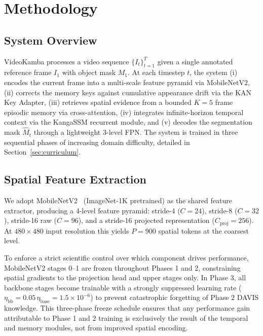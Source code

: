 \documentclass[sigconf]{acmart}
\begin{document}
\section{Methodology}
\label{sec:method}

\subsection{System Overview}
VideoKamba processes a video sequence $\{I_t\}_{t=1}^{T}$ given a single annotated reference frame $I_1$ with object mask $M_1$. At each timestep $t$, the system (i) encodes the current frame into a multi-scale feature pyramid via MobileNetV2, (ii) corrects the memory keys against cumulative appearance drift via the KAN Key Adapter, (iii) retrieves spatial evidence from a bounded $K=5$ frame episodic memory via cross-attention, (iv) integrates infinite-horizon temporal context via the KangaSSM recurrent module, and (v) decodes the segmentation mask $\hat{M}_t$ through a lightweight 3-level FPN. The system is trained in three sequential phases of increasing domain difficulty, detailed in Section~\ref{sec:curriculum}.

\subsection{Spatial Feature Extraction}
\label{sec:encoder}
We adopt MobileNetV2~\cite{sandler2018mobilenetv2} (ImageNet-1K pretrained) as the shared feature extractor, producing a 4-level feature pyramid: stride-4 ($C=24$), stride-8 ($C=32$), stride-16 raw ($C=96$), and a stride-16 projected representation ($C_\text{proj}=256$). At $480\times480$ input resolution this yields $P=900$ spatial tokens at the coarsest level.

To enforce a strict scientific control over which component drives performance, MobileNetV2 stages 0--1 are frozen throughout Phases 1 and 2, constraining spatial gradients to the projection head and upper stages only. In Phase 3, all backbone stages become trainable with a strongly suppressed learning rate ($\eta_\text{bb} = 0.05\,\eta_\text{base} = 1.5\times10^{-6}$) to prevent catastrophic forgetting of Phase 2 DAVIS knowledge. This three-phase freeze schedule ensures that any performance gain attributable to Phase 1 and 2 training is exclusively the result of the temporal and memory modules, not from improved spatial encoding.
\end{document}
